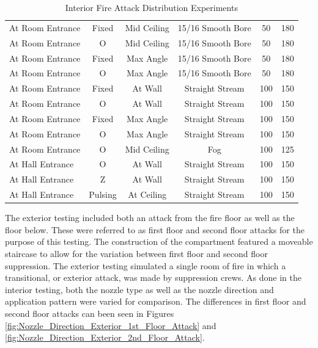 \documentclass{article}
\begin{document}
\begin{table}[]
{\begin{tabular}{|lccccc|}
At Room Entrance & Fixed & Mid Ceiling & 15/16 Smooth Bore & 50 & 180 \\
At Room Entrance & O & Mid Ceiling & 15/16 Smooth Bore & 50 & 180 \\
At Room Entrance & Fixed & Max Angle & 15/16 Smooth Bore & 50 & 180 \\
At Room Entrance & O & Max Angle & 15/16 Smooth Bore & 50 & 180 \\
At Room Entrance & Fixed & At Wall & Straight Stream & 100 & 150 \\
At Room Entrance & O & At Wall & Straight Stream & 100 & 150 \\
At Room Entrance & Fixed & Max Angle & Straight Stream & 100 & 150 \\
At Room Entrance & O & Max Angle & Straight Stream & 100 & 150 \\
At Room Entrance & O & Mid Ceiling & Fog & 100 & 125 \\
At Hall Entrance & O & At Wall & Straight Stream & 100 & 150 \\
At Hall Entrance & Z & At Wall & Straight Stream & 100 & 150 \\
At Hall Entrance & Pulsing & At Ceiling & Straight Stream & 100 & 150 \\ \hline
\end{tabular}}
\caption{Interior Fire Attack Distribution Experiments}
\label{Interior_Fire_Attack_Distribution_Experiments}
\end{table}

\clearpage

The exterior testing included both an attack from the fire floor as well as the floor below. These were referred to as first floor and second floor attacks for the purpose of this testing. The construction of the compartment featured a moveable staircase to allow for the variation between first floor and second floor suppression. The exterior testing simulated a single room of fire in which a transitional, or exterior attack, was made by suppression crews. As done in the interior testing, both the nozzle type as well as the nozzle direction and application pattern were varied for comparison. The differences in first floor and second floor attacks can been seen in Figures \ref{fig:Nozzle_Direction_Exterior_1st_Floor_Attack} and \ref{fig:Nozzle_Direction_Exterior_2nd_Floor_Attack}.
\end{document}
